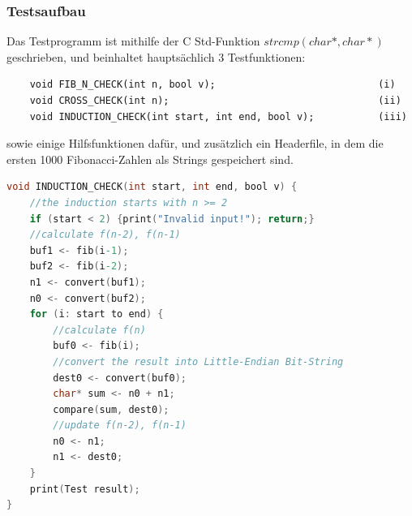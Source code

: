 \documentclass[course=erap]{aspdoc}
\begin{document}
\subsubsection{Testsaufbau}
Das Testprogramm ist mithilfe der C Std-Funktion $strcmp(char*, char*)$ geschrieben, und beinhaltet hauptsächlich 3 Testfunktionen: 
\begin{lstlisting}
	void FIB_N_CHECK(int n, bool v);                            (i)
	void CROSS_CHECK(int n);                                    (ii)
	void INDUCTION_CHECK(int start, int end, bool v);           (iii)
\end{lstlisting}
\noindent
sowie einige Hilfsfunktionen dafür, und zusätzlich ein Headerfile, in dem die ersten 1000 Fibonacci-Zahlen als Strings gespeichert sind.
\begin{lstlisting}[language=C, caption=Pseudo Code von (iii).]
void INDUCTION_CHECK(int start, int end, bool v) {
	//the induction starts with n >= 2
	if (start < 2) {print("Invalid input!"); return;}
	//calculate f(n-2), f(n-1)
	buf1 <- fib(i-1);
	buf2 <- fib(i-2);
	n1 <- convert(buf1);
	n0 <- convert(buf2);
	for (i: start to end) {
		//calculate f(n)
		buf0 <- fib(i);
		//convert the result into Little-Endian Bit-String
		dest0 <- convert(buf0);
		char* sum <- n0 + n1;
		compare(sum, dest0);
		//update f(n-2), f(n-1)
		n0 <- n1;
		n1 <- dest0;
	}
	print(Test result);
}
\end{lstlisting}
\end{document}
